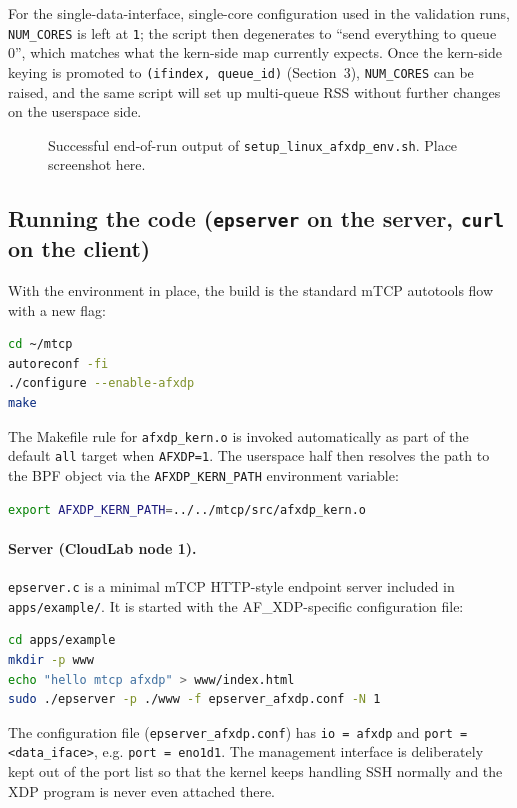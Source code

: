 \documentclass[10pt, letterpaper, twocolumn]{article}
\begin{document}
For the single-data-interface, single-core configuration used in the validation runs, \texttt{NUM\_CORES} is left at \texttt{1}; the script then degenerates to ``send everything to queue 0'', which matches what the kern-side map currently expects. Once the kern-side keying is promoted to \texttt{(ifindex, queue\_id)} (Section~3), \texttt{NUM\_CORES} can be raised, and the same script will set up multi-queue RSS without further changes on the userspace side.

\begin{figure}[htbp]
    \centering
    \caption{Successful end-of-run output of \texttt{setup\_linux\_afxdp\_env.sh}. Place screenshot here.}
    \label{fig:env_setup}
\end{figure}
\FloatBarrier

\subsection{Running the code (\texttt{epserver} on the server, \texttt{curl} on the client)}

With the environment in place, the build is the standard mTCP autotools flow with a new flag:
\begin{lstlisting}[language=bash]
cd ~/mtcp
autoreconf -fi
./configure --enable-afxdp
make
\end{lstlisting}
The Makefile rule for \texttt{afxdp\_kern.o} is invoked automatically as part of the default \texttt{all} target when \texttt{AFXDP=1}. The userspace half then resolves the path to the BPF object via the \texttt{AFXDP\_KERN\_PATH} environment variable:
\begin{lstlisting}[language=bash]
export AFXDP_KERN_PATH=../../mtcp/src/afxdp_kern.o
\end{lstlisting}

\paragraph{Server (CloudLab node 1).} \texttt{epserver.c} is a minimal mTCP HTTP-style endpoint server included in \texttt{apps/example/}. It is started with the AF\_XDP-specific configuration file:
\begin{lstlisting}[language=bash]
cd apps/example
mkdir -p www
echo "hello mtcp afxdp" > www/index.html
sudo ./epserver -p ./www -f epserver_afxdp.conf -N 1
\end{lstlisting}
The configuration file (\texttt{epserver\_afxdp.conf}) has \texttt{io = afxdp} and \texttt{port = <data\_iface>}, e.g. \texttt{port = eno1d1}. The management interface is deliberately kept out of the port list so that the kernel keeps handling SSH normally and the XDP program is never even attached there.
\end{document}
